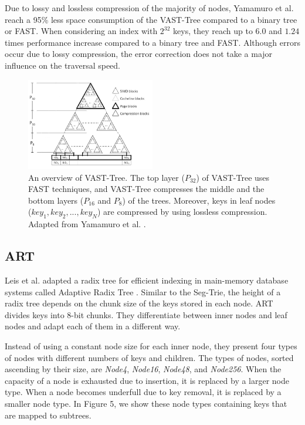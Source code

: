 \documentclass[conference]{IEEEtran}
\begin{document}
Due to lossy and lossless compression of the majority of nodes, Yamamuro et al. reach a 95\% less space consumption of the VAST-Tree compared to a binary tree or FAST. When considering an index with $2^{32}$ keys, they reach up to $6.0$ and $1.24$ times performance increase compared to a binary tree and FAST. Although errors occur due to lossy compression, the error correction does not take a major influence on the traversal speed.

\begin{figure}
	\includegraphics[width=0.5\textwidth]{figure_5.png}
	\caption{An overview of VAST-Tree. The top layer ($P_{32}$) of VAST-Tree uses FAST techniques, and VAST-Tree compresses the middle and the bottom layers ($P_{16}$ and $P_8$) of the trees. Moreover, keys in leaf nodes ($key_1, key_2, ...,	key_N$) are compressed by using lossless compression. Adapted from Yamamuro et al. \cite{b5}.}
	\label{fig}
\end{figure}


\subsection{ART}\label{SCM}
Leis et al. adapted a radix tree for efficient indexing in main-memory database systems called Adaptive Radix Tree \cite{b4}. Similar to the Seg-Trie, the height of a radix tree depends on the chunk size of the keys stored in each node. ART divides keys into 8-bit chunks. They differentiate between inner nodes and leaf nodes and adapt each of them in a different way.

Instead of using a constant node size for each inner node, they present four types of nodes with different numbers of keys and children. The types of nodes, sorted ascending by their size, are \emph{Node4}, \emph{Node16}, \emph{Node48}, and \emph{Node256}. When the capacity of a node is exhausted due to insertion, it is replaced by a larger node type. When a node becomes underfull due to key removal, it is replaced by a smaller node type. In Figure 5, we show these node types containing keys that are mapped to subtrees.
\end{document}
